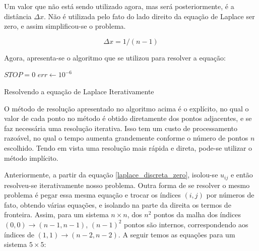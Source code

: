 \documentclass[journal]{IEEEtran}
\begin{document}
Um valor que não está sendo utilizado agora, mas será posteriormente, é a distância $\Delta x$. Não é utilizada pelo fato do lado direito da equação de Laplace ser zero, e assim simplificou-se o problema.

\begin{equation}
\Delta x = 1/(n-1)
\end{equation}

Agora, apresenta-se o algoritmo que se utilizou para resolver a equação:

\begin{algorithm}
\BlankLine
$STOP=0$\;
$err \leftarrow 10^{-6}$\;

\caption{Resolvendo a equação de Laplace Iterativamente}\label{algo_laplace_iter}
\end{algorithm}

O método de resolução apresentado no algoritmo acima é o explícito, no qual o valor de cada ponto no método é obtido diretamente dos pontos adjacentes, e se faz necessária uma resolução iterativa. Isso tem um custo de processamento razoável, no qual o tempo aumenta grandemente conforme o número de pontos $n$ escolhido. Tendo em vista uma resolução mais rápida e direta, pode-se utilizar o método implícito.

Anteriormente, a partir da equação \ref{laplace_discreta_zero}, isolou-se $u_{ij}$ e então resolveu-se iterativamente nosso problema. Outra forma de se resolver o mesmo problema é pegar essa mesma equação e trocar os índices $(i,j)$ por números de fato, obtendo várias equações, e isolando na parte da direita os termos de fronteira. Assim, para um sistema $n\times n$, dos $n^2$ pontos da malha dos índices $(0,0)\rightarrow (n-1,n-1)$, $(n-1)^2$ pontos são internos, correspondendo aos índices de $(1,1)\rightarrow (n-2,n-2)$. A seguir temos as equações para um sistema $5\times 5$:
\end{document}
